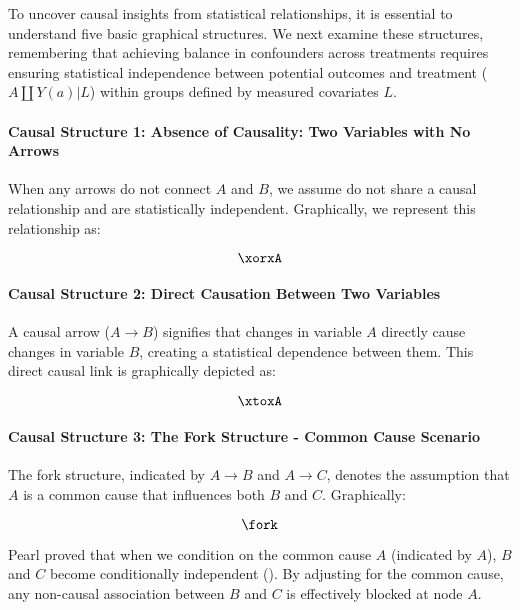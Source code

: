 \documentclass[
  singlecolumn]{article}
\let\oldparagraph\paragraph
\renewcommand{\paragraph}[1]{\oldparagraph{#1}\mbox{}}
\begin{document}
To uncover causal insights from statistical relationships, it is
essential to understand five basic graphical structures. We next examine
these structures, remembering that achieving balance in confounders
across treatments requires ensuring statistical independence between
potential outcomes and treatment (\(A\coprod Y(a)|L\)) within groups
defined by measured covariates \(L\).

\paragraph{Causal Structure 1: Absence of Causality: Two Variables with
No
Arrows}\label{causal-structure-1-absence-of-causality-two-variables-with-no-arrows}

When any arrows do not connect \(A\) and \(B\), we assume do not share a
causal relationship and are statistically independent. Graphically, we
represent this relationship as:

\[\xorxA\]

\paragraph{Causal Structure 2: Direct Causation Between Two
Variables}\label{causal-structure-2-direct-causation-between-two-variables}

A causal arrow (\(A \to B\)) signifies that changes in variable \(A\)
directly cause changes in variable \(B\), creating a statistical
dependence between them. This direct causal link is graphically depicted
as:

\[\xtoxA\]

\paragraph{Causal Structure 3: The Fork Structure - Common Cause
Scenario}\label{causal-structure-3-the-fork-structure---common-cause-scenario}

The fork structure, indicated by \(A \rightarrow B\) and
\(A \rightarrow C\), denotes the assumption that \(A\) is a common cause
that influences both \(B\) and \(C\). Graphically:

\[\fork\]

Pearl proved that when we condition on the common cause \(A\) (indicated
by \(\boxed{A}\)), \(B\) and \(C\) become conditionally independent
(). By adjusting for the common
cause, any non-causal association between \(B\) and \(C\) is effectively
blocked at node \(A\).
\end{document}
